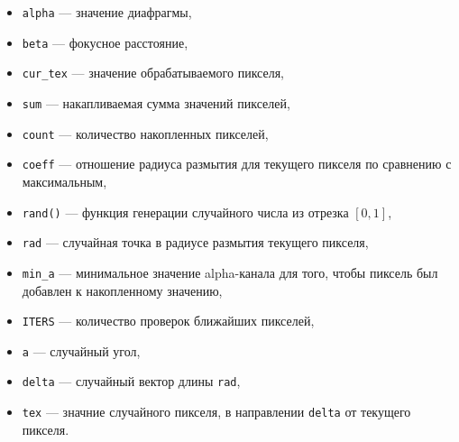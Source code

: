 \begin{itemize}
\item \texttt{alpha} --- значение диафрагмы,
\item \texttt{beta} --- фокусное расстояние,
\item \texttt{cur\_tex} --- значение обрабатываемого пикселя,
\item \texttt{sum} --- накапливаемая сумма значений пикселей,
\item \texttt{count} --- количество накопленных пикселей,
\item \texttt{coeff} --- отношение радиуса размытия для текущего пикселя по сравнению с максимальным,
\item \texttt{rand()} --- функция генерации случайного числа из отрезка $[0, 1]$,
\item \texttt{rad} --- случайная точка в радиусе размытия текущего пикселя,
\item \texttt{min\_a} --- минимальное значение alpha-канала для того, чтобы пиксель был добавлен к накопленному значению,
\item \texttt{ITERS} --- количество проверок ближайших пикселей,
\item \texttt{a} --- случайный угол,
\item \texttt{delta} --- случайный вектор длины \texttt{rad},
\item \texttt{tex} --- значние случайного пикселя, в направлении \texttt{delta} от текущего пикселя.
\end{itemize}

